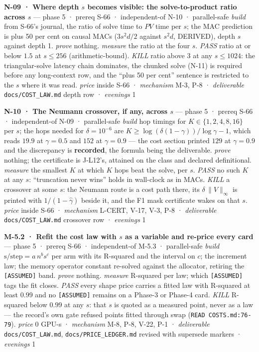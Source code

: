 \documentclass[11pt,a4paper]{article}
\theoremstyle{plain}
\theoremstyle{definition}
\theoremstyle{remark}
\begin{document}
\textbf{N-09 · Where depth \(s\) becomes visible: the solve-to-product
ratio across \(s\)} --- phase 5 · prereq S-66 · independent-of N-10 ·
parallel-safe \emph{build} from S-66's journal, the ratio of solve time
to \(PV\) time per \(s\); the MAC prediction is plus 50 per cent on
causal MACs (\(3s^2d/2\) against \(s^2d\), DERIVED), depth \(s\) against
depth 1. \emph{prove} nothing. \emph{measure} the ratio at the four
\(s\). \emph{PASS} ratio at or below \(1.5\) at \(s\le256\)
(arithmetic-bound). \emph{KILL} ratio above \(3\) at any \(s\le1024\):
the triangular-solve latency chain dominates, the chunked solve (N-11)
is required before any long-context row, and the ``plus 50 per cent''
sentence is restricted to the \(s\) where it was read. \emph{price}
inside S-66 · \emph{mechanism} M-3, P-8 · \emph{deliverable}
\texttt{docs/COST\_LAW.md} depth row · \emph{evenings} 1

\textbf{N-10 · The Neumann crossover, if any, across \(s\)} --- phase 5
· prereq S-66 · independent-of N-09 · parallel-safe \emph{build} hop
timings for \(K\in\{1,2,4,8,16\}\) per \(s\); the hops needed for
\(\delta=10^{-6}\) are \(K\ge\log(\delta(1-\gamma))/\log\gamma-1\),
which reads \(19.9\) at \(\gamma=0.5\) and \(152\) at \(\gamma=0.9\) ---
the cost section printed \(129\) at \(\gamma=0.9\) and the discrepancy
is \textbf{recorded}, the formula being the deliverable. \emph{prove}
nothing; the certificate is J-L12's, attained on the class and declared
definitional. \emph{measure} the smallest \(K\) at which \(K\) hops beat
the solve, per \(s\). \emph{PASS} no such \(K\) at any \(s\):
``truncation never wins'' holds in wall-clock as in MACs. \emph{KILL} a
crossover at some \(s\): the Neumann route is a cost path there, its
\(\delta\,\|V\|_\infty\) is printed with \(1/(1-\hat\gamma)\) beside it,
and the F1 mask certificate wakes on that \(s\). \emph{price} inside
S-66 · \emph{mechanism} L-CERT, V-17, V-3, P-8 · \emph{deliverable}
\texttt{docs/COST\_LAW.md} crossover row · \emph{evenings} 1

\textbf{M-5.2 · Refit the cost law with \(s\) as a variable and re-price
every card} --- phase 5 · prereq S-66 · independent-of M-5.3 ·
parallel-safe \emph{build} \(\text{s/step}=a\,n^{b}s^{c}\) per arm with
its R-squared and the interval on \(c\); the increment law; the memory
operator constant re-solved against the allocator, retiring the
\texttt{{[}ASSUMED{]}} band. \emph{prove} nothing. \emph{measure}
R-squared per law; which \texttt{{[}ASSUMED{]}} tags the fit closes.
\emph{PASS} every shape price carries a fitted law with R-squared at
least \(0.99\) and no \texttt{{[}ASSUMED{]}} remains on a Phase-3 or
Phase-4 card. \emph{KILL} R-squared below \(0.99\) at any \(s\): that
\(s\) is quoted as a measured point, never as a law --- the record's own
gate refused points fitted through swap (\texttt{READ\ COSTS.md:76-79}).
\emph{price} \(0\) GPU-s · \emph{mechanism} M-8, P-8, V-22, P-1 ·
\emph{deliverable} \texttt{docs/COST\_LAW.md},
\texttt{docs/PRICE\_LEDGER.md} revised with supersede markers ·
\emph{evenings} 1
\end{document}
